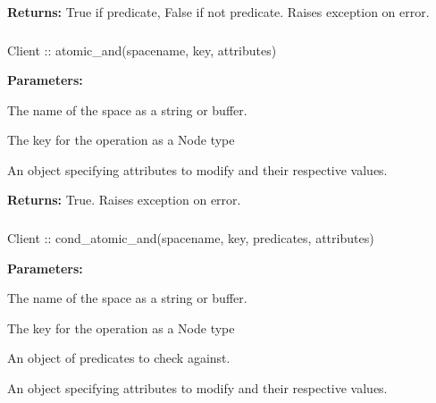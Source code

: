 \noindent\textbf{Returns:}
True if predicate, False if not predicate.  Raises exception on error.

\subsubsection{}
\label{api:nodejs:atomic_and}
\begin{javascriptcode}
Client :: atomic_and(spacename, key, attributes)
\end{javascriptcode}


\noindent\textbf{Parameters:}
\begin{description}[labelindent=\widthof{{\code{attributes}}},leftmargin=*,noitemsep,nolistsep,align=right]
\item[\code{spacename}] The name of the space as a string or buffer.
\item[\code{key}] The key for the operation as a Node type
\item[\code{attributes}] An object specifying attributes to modify and their respective values.
\end{description}

\noindent\textbf{Returns:}
True.  Raises exception on error.

\subsubsection{}
\label{api:nodejs:cond_atomic_and}
\begin{javascriptcode}
Client :: cond_atomic_and(spacename, key, predicates, attributes)
\end{javascriptcode}


\noindent\textbf{Parameters:}
\begin{description}[labelindent=\widthof{{\code{predicates}}},leftmargin=*,noitemsep,nolistsep,align=right]
\item[\code{spacename}] The name of the space as a string or buffer.
\item[\code{key}] The key for the operation as a Node type
\item[\code{predicates}] An object of predicates to check against.
\item[\code{attributes}] An object specifying attributes to modify and their respective values.
\end{description}

